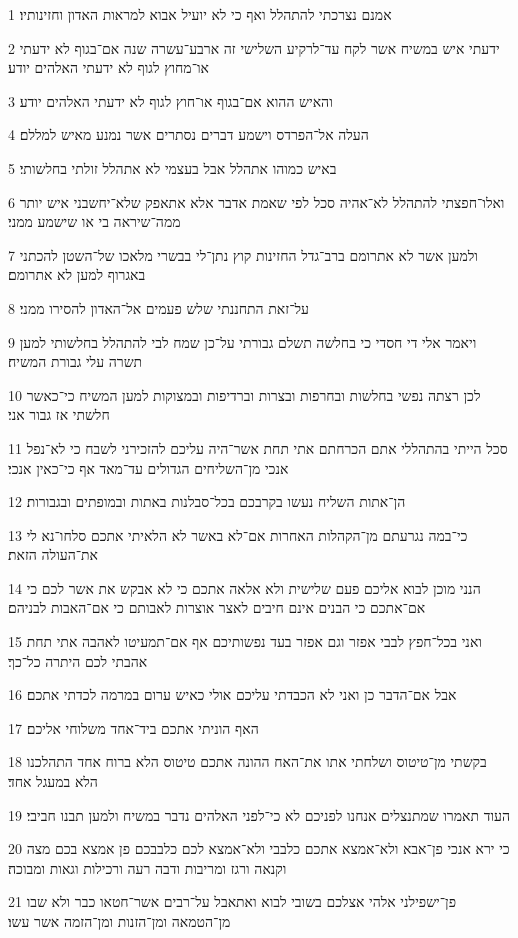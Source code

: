 \par 1 אמנם נצרכתי להתהלל ואף כי לא יועיל אבוא למראות האדון וחזינותיו׃
\par 2 ידעתי איש במשיח אשר לקח עד־לרקיע השלישי זה ארבע־עשרה שנה אם־בגוף לא ידעתי או־מחוץ לגוף לא ידעתי האלהים יודע׃
\par 3 והאיש ההוא אם־בגוף או־חוץ לגוף לא ידעתי האלהים יודע׃
\par 4 העלה אל־הפרדס וישמע דברים נסתרים אשר נמנע מאיש למללם׃
\par 5 באיש כמוהו אתהלל אבל בעצמי לא אתהלל זולתי בחלשותי׃
\par 6 ואלו־חפצתי להתהלל לא־אהיה סכל לפי שאמת אדבר אלא אתאפק שלא־יחשבני איש יותר ממה־שיראה בי או שישמע ממני׃
\par 7 ולמען אשר לא אתרומם ברב־גדל החזינות קוץ נתן־לי בבשרי מלאכו של־השטן להכתני באגרוף למען לא אתרומם׃
\par 8 על־זאת התחננתי שלש פעמים אל־האדון להסירו ממני׃
\par 9 ויאמר אלי די חסדי כי בחלשה תשלם גבורתי על־כן שמח לבי להתהלל בחלשותי למען תשרה עלי גבורת המשיח׃
\par 10 לכן רצתה נפשי בחלשות ובחרפות ובצרות וברדיפות ובמצוקות למען המשיח כי־כאשר חלשתי אז גבור אני׃
\par 11 סכל הייתי בהתהללי אתם הכרחתם אתי תחת אשר־היה עליכם להזכירני לשבח כי לא־נפל אנכי מן־השליחים הגדולים עד־מאד אף כי־כאין אנכי׃
\par 12 הן־אתות השליח נעשו בקרבכם בכל־סבלנות באתות ובמופתים ובגבורות׃
\par 13 כי־במה נגרעתם מן־הקהלות האחרות אם־לא באשר לא הלאיתי אתכם סלחו־נא לי את־העולה הזאת׃
\par 14 הנני מוכן לבוא אליכם פעם שלישית ולא אלאה אתכם כי לא אבקש את אשר לכם כי אם־אתכם כי הבנים אינם חיבים לאצר אוצרות לאבותם כי אם־האבות לבניהם׃
\par 15 ואני בכל־חפץ לבבי אפזר וגם אפזר בעד נפשותיכם אף אם־תמעיטו לאהבה אתי תחת אהבתי לכם היתרה כל־כך׃
\par 16 אבל אם־הדבר כן ואני לא הכבדתי עליכם אולי כאיש ערום במרמה לכדתי אתכם׃
\par 17 האף הוניתי אתכם ביד־אחד משלוחי אליכם׃
\par 18 בקשתי מן־טיטוס ושלחתי אתו את־האח ההונה אתכם טיטוס הלא ברוח אחד התהלכנו הלא במעגל אחד׃
\par 19 העוד תאמרו שמתנצלים אנחנו לפניכם לא כי־לפני האלהים נדבר במשיח ולמען תבנו חביבי׃
\par 20 כי ירא אנכי פן־אבא ולא־אמצא אתכם כלבבי ולא־אמצא לכם כלבבכם פן אמצא בכם מצה וקנאה ורגז ומריבות ודבה רעה ורכילות וגאות ומבוכה׃
\par 21 פן־ישפילני אלהי אצלכם בשובי לבוא ואתאבל על־רבים אשר־חטאו כבר ולא שבו מן־הטמאה ומן־הזנות ומן־הזמה אשר עשו׃

